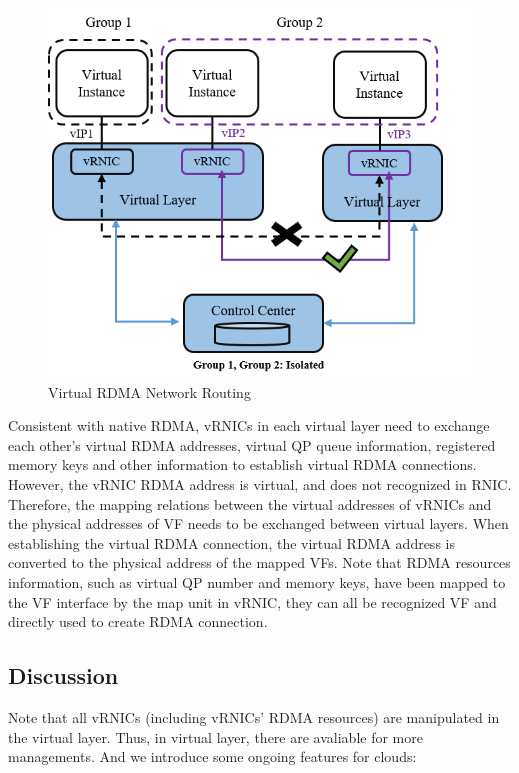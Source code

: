 \begin{figure}[!ht]
	\centering
	\includegraphics[width=1.0\linewidth]{images/route-config}
	\caption{Virtual RDMA Network Routing}
	\label{fig:route-config}
\end{figure}

Consistent with native RDMA, vRNICs in each virtual layer need to exchange each other's virtual RDMA addresses, virtual QP queue information, registered memory keys and other information to establish virtual RDMA connections. However, the vRNIC RDMA address is virtual, and does not recognized in RNIC. Therefore, the mapping relations between the virtual addresses of vRNICs and the physical addresses of VF needs to be exchanged between virtual layers. When establishing the virtual RDMA connection, the virtual RDMA address is converted to the physical address of the mapped VFs. Note that RDMA resources information, such as virtual QP number and memory keys, have been mapped to the VF interface by the map unit in vRNIC, they can all be recognized VF and directly used to create RDMA connection.

\subsection{Discussion}
Note that all vRNICs (including vRNICs' RDMA resources) are manipulated in the virtual layer. Thus, in virtual layer, there are avaliable for more managements. And we introduce some ongoing features for clouds:

